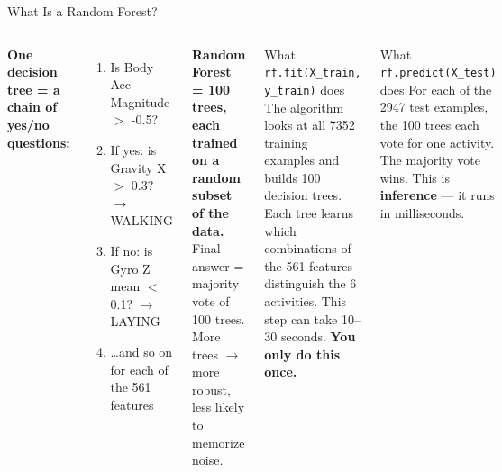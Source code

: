 \documentclass[aspectratio=169,11pt]{beamer}
\begin{document}
\begin{frame}[shrink=10]{What Is a Random Forest?}
    \begin{columns}
        \textbf{One decision tree = a chain of yes/no questions:}
        \begin{enumerate}
            \item Is Body Acc Magnitude $>$ -0.5?
            \item If yes: is Gravity X $>$ 0.3? $\rightarrow$ WALKING
            \item If no: is Gyro Z mean $<$ 0.1? $\rightarrow$ LAYING
            \item \ldots and so on for each of the 561 features
        \end{enumerate}

        \vspace{0.2cm}
        \textbf{Random Forest = 100 trees, each trained on a random subset of the data.} Final answer = majority vote of 100 trees. More trees $\rightarrow$ more robust, less likely to memorize noise.

        \begin{exampleblock}{What \texttt{rf.fit(X\_train, y\_train)} does}
            The algorithm looks at all 7352 training examples and builds 100 decision trees. Each tree learns which combinations of the 561 features distinguish the 6 activities. This step can take 10--30 seconds. \textbf{You only do this once.}
        \end{exampleblock}

        \vspace{0.2cm}
        \begin{exampleblock}{What \texttt{rf.predict(X\_test)} does}
            For each of the 2947 test examples, the 100 trees each vote for one activity. The majority vote wins. This is \textbf{inference} --- it runs in milliseconds.
        \end{exampleblock}
    \end{columns}
\end{frame}
\end{document}

